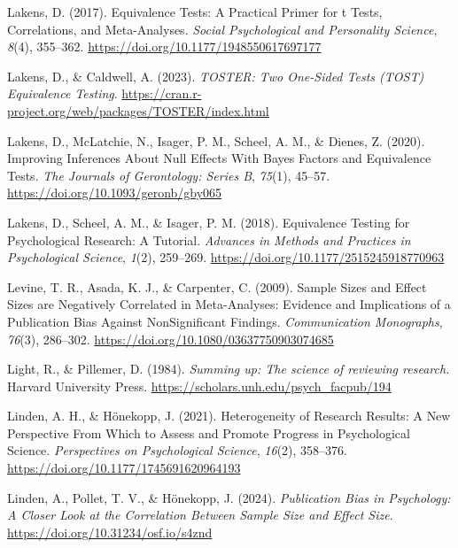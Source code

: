 \documentclass[
  12pt,
]{scrartcl}
\newlength{\cslhangindent}
\newenvironment{CSLReferences}[2] %
 {\begin{list}{}{%
  \setlength{\itemindent}{0pt}
  \setlength{\leftmargin}{0pt}
  \setlength{\parsep}{0pt}
  \ifodd #1
   \setlength{\leftmargin}{\cslhangindent}
   \setlength{\itemindent}{-1\cslhangindent}
  \fi
  \setlength{\itemsep}{#2\baselineskip}}}
 {\end{list}}
\begin{document}
\begin{CSLReferences}{1}{0}
Lakens, D. (2017). Equivalence {Tests}: {A} {Practical} {Primer} for t
{Tests}, {Correlations}, and {Meta}-{Analyses}. \emph{Social
Psychological and Personality Science}, \emph{8}(4), 355--362.
\url{https://doi.org/10.1177/1948550617697177}

Lakens, D., \& Caldwell, A. (2023). \emph{{TOSTER}: {Two} {One}-{Sided}
{Tests} ({TOST}) {Equivalence} {Testing}}.
\url{https://cran.r-project.org/web/packages/TOSTER/index.html}

Lakens, D., McLatchie, N., Isager, P. M., Scheel, A. M., \& Dienes, Z.
(2020). Improving {Inferences} {About} {Null} {Effects} {With} {Bayes}
{Factors} and {Equivalence} {Tests}. \emph{The Journals of Gerontology:
Series B}, \emph{75}(1), 45--57.
\url{https://doi.org/10.1093/geronb/gby065}

Lakens, D., Scheel, A. M., \& Isager, P. M. (2018). Equivalence
{Testing} for {Psychological} {Research}: {A} {Tutorial}. \emph{Advances
in Methods and Practices in Psychological Science}, \emph{1}(2),
259--269. \url{https://doi.org/10.1177/2515245918770963}

Levine, T. R., Asada, K. J., \& Carpenter, C. (2009). Sample {Sizes} and
{Effect} {Sizes} are {Negatively} {Correlated} in {Meta}-{Analyses}:
{Evidence} and {Implications} of a {Publication} {Bias} {Against}
{NonSignificant} {Findings}. \emph{Communication Monographs},
\emph{76}(3), 286--302. \url{https://doi.org/10.1080/03637750903074685}

Light, R., \& Pillemer, D. (1984). \emph{Summing up: {The} science of
reviewing research.} Harvard University Press.
\url{https://scholars.unh.edu/psych_facpub/194}

Linden, A. H., \& Hönekopp, J. (2021). Heterogeneity of {Research}
{Results}: {A} {New} {Perspective} {From} {Which} to {Assess} and
{Promote} {Progress} in {Psychological} {Science}. \emph{Perspectives on
Psychological Science}, \emph{16}(2), 358--376.
\url{https://doi.org/10.1177/1745691620964193}

Linden, A., Pollet, T. V., \& Hönekopp, J. (2024). \emph{Publication
{Bias} in {Psychology}: {A} {Closer} {Look} at the {Correlation}
{Between} {Sample} {Size} and {Effect} {Size}}.
\url{https://doi.org/10.31234/osf.io/s4znd}


\end{CSLReferences}
\end{document}
